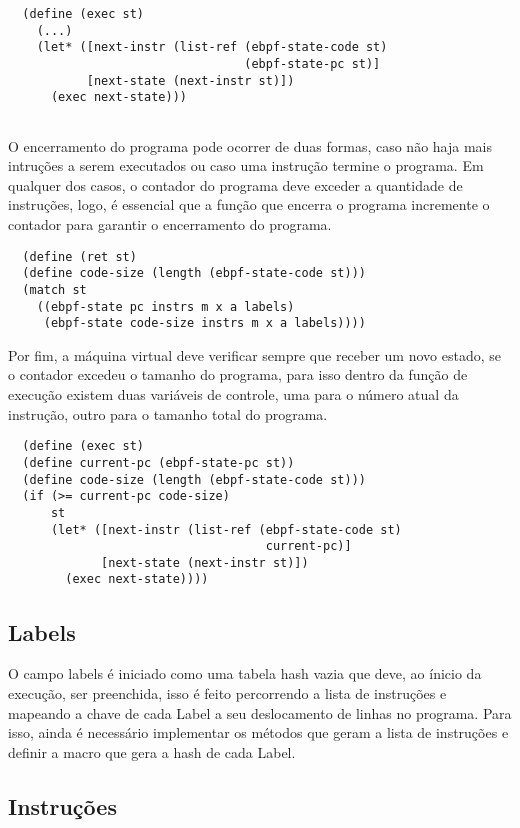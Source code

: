 \documentclass[paper=a4, fontsize=12pt]{article}
\theoremstyle{definition}
\begin{document}
\begin{lstlisting}
  (define (exec st)
    (...)
    (let* ([next-instr (list-ref (ebpf-state-code st)
                                 (ebpf-state-pc st)]
           [next-state (next-instr st)])
      (exec next-state)))  
           
\end{lstlisting}

O encerramento do programa pode ocorrer de duas formas, caso não haja mais intruções a 
serem executados ou caso uma instrução termine o programa. Em qualquer dos casos, o contador do 
programa deve exceder a quantidade de instruções, logo, é essencial que a função que encerra o
programa incremente o contador para garantir o encerramento do programa.

\begin{lstlisting}
  (define (ret st)
  (define code-size (length (ebpf-state-code st)))
  (match st
    ((ebpf-state pc instrs m x a labels)
     (ebpf-state code-size instrs m x a labels))))
\end{lstlisting}

Por fim, a máquina virtual deve verificar sempre que receber um novo estado, se o contador
excedeu o tamanho do programa, para isso dentro da função de execução existem duas variáveis de
controle, uma para o número atual da instrução, outro para o tamanho total do programa.

\begin{lstlisting}
  (define (exec st)
  (define current-pc (ebpf-state-pc st))
  (define code-size (length (ebpf-state-code st)))
  (if (>= current-pc code-size)
      st
      (let* ([next-instr (list-ref (ebpf-state-code st) 
                                    current-pc)]
             [next-state (next-instr st)])
        (exec next-state))))
\end{lstlisting}

\subsection{Labels}

O campo labels é iniciado como uma tabela hash vazia que deve, ao ínicio da execução,
ser preenchida, isso é feito percorrendo a lista de instruções e mapeando a chave de
cada Label a seu deslocamento de linhas no programa. Para isso, ainda é necessário 
implementar os métodos que geram a lista de instruções e definir a macro que gera a
hash de cada Label.

\subsection{Instruções}
\end{document}
